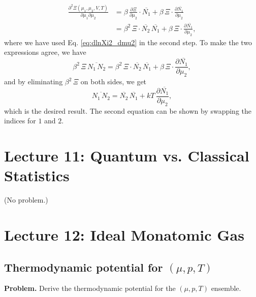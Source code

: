 \documentclass[twocolumn, 10pt]{article}
\numberwithin{equation}{section}
\newenvironment{problem}
{\par\medskip \color{problemblue}
  \textbf{Problem. }\ignorespaces}
{\medskip}
\newenvironment{solution}[1][\empty]
{\par\medskip\sffamily
  \textbf{\ifx\empty#1{Solution.}\relax\else{#1}\fi} \ignorespaces}
{\medskip}
\begin{document}
\begin{solution}
\begin{align*}
  \frac{ \partial^2 \Xi(\mu_1, \mu_2, V, T) }
       { \partial \mu_1 \partial \mu_2 }
  &=
    \beta \, \frac{ \partial \Xi } { \partial \mu_2 } \cdot
    \overline{ N_1 }
    +
    \beta \, \Xi \cdot
    \frac{ \partial \overline{ N_1 } } { \partial \mu_2 }
  \\
  &=
    \beta^2 \, \Xi \cdot
    \overline{ N_2 } \, \overline{ N_1 }
    +
    \beta \, \Xi \cdot
    \frac{ \partial \overline{ N_1 } } { \partial \mu_2 }
  ,
\end{align*}
%
where we have used Eq. \eqref{eq:dlnXi2_dmu2} in the second step.
To make the two expressions agree, we have
$$
  \beta^2 \, \Xi \, \overline{ N_1 \, N_2 }
  =
  \beta^2 \, \Xi \cdot
  \overline{ N_2 } \, \overline{ N_1 }
  +
  \beta \, \Xi \cdot
  \frac{ \partial \overline{ N_1 } } { \partial \mu_2 }
  ,
$$
and by eliminating $\beta^2 \, \Xi$
on both sides, we get
$$
  \overline{ N_1 \, N_2 }
  =
  \overline{ N_2 } \, \overline{ N_1 }
  +
  kT \,
  \frac{ \partial \overline{ N_1 } } { \partial \mu_2 }
  ,
$$
%
which is the desired result.
%
The second equation can be shown by swapping the indices for $1$ and $2$.
\end{solution}




\section{Lecture 11: Quantum vs. Classical Statistics}

(No problem.)



\section{Lecture 12: Ideal Monatomic Gas}

\subsection{Thermodynamic potential for $(\mu, p, T)$}

\begin{problem}
Derive the thermodynamic potential for the $(\mu, p, T)$ ensemble.
\end{problem}
\end{document}
